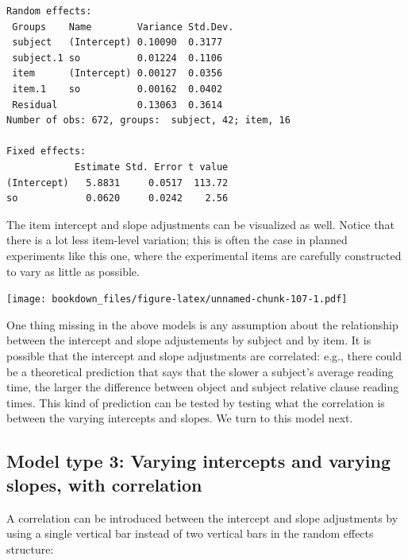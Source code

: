 \documentclass[12pt,]{krantz}
\newenvironment{Shaded}{\begin{snugshade}}{\end{snugshade}}
\newcommand{\DataTypeTok}[1]{\textcolor[rgb]{0.13,0.29,0.53}{#1}}
\newcommand{\KeywordTok}[1]{\textcolor[rgb]{0.13,0.29,0.53}{\textbf{#1}}}
\newcommand{\NormalTok}[1]{#1}
\newcommand{\OperatorTok}[1]{\textcolor[rgb]{0.81,0.36,0.00}{\textbf{#1}}}
\newcommand{\OtherTok}[1]{\textcolor[rgb]{0.56,0.35,0.01}{#1}}
\begin{document}
\begin{verbatim}
Random effects:
 Groups    Name        Variance Std.Dev.
 subject   (Intercept) 0.10090  0.3177  
 subject.1 so          0.01224  0.1106  
 item      (Intercept) 0.00127  0.0356  
 item.1    so          0.00162  0.0402  
 Residual              0.13063  0.3614  
Number of obs: 672, groups:  subject, 42; item, 16

Fixed effects:
            Estimate Std. Error t value
(Intercept)   5.8831     0.0517  113.72
so            0.0620     0.0242    2.56
\end{verbatim}

The item intercept and slope adjustments can be visualized as well. Notice that there is a lot less item-level variation; this is often the case in planned experiments like this one, where the experimental items are carefully constructed to vary as little as possible.

\begin{Shaded}
\end{Shaded}

\texttt{[image: bookdown\_files/figure-latex/unnamed-chunk-107-1.pdf]}

One thing missing in the above models is any assumption about the relationship between the intercept and slope adjustements by subject and by item. It is possible that the intercept and slope adjustments are correlated: e.g., there could be a theoretical prediction that says that the slower a subject's average reading time, the larger the difference between object and subject relative clause reading times. This kind of prediction can be tested by testing what the correlation is between the varying intercepts and slopes. We turn to this model next.

\hypertarget{model-type-3-varying-intercepts-and-varying-slopes-with-correlation}{%
\subsection{Model type 3: Varying intercepts and varying slopes, with correlation}\label{model-type-3-varying-intercepts-and-varying-slopes-with-correlation}}

A correlation can be introduced between the intercept and slope adjustments by using a single vertical bar instead of two vertical bars in the random effects structure:
\end{document}
